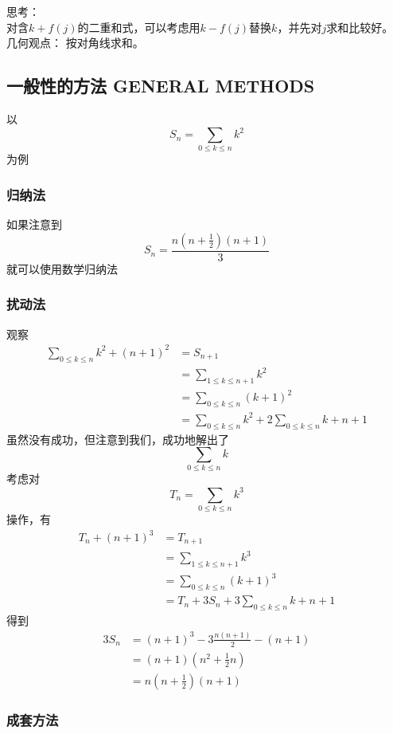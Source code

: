 思考：\\

对含$k+f(j)$的二重和式，可以考虑用$k-f(j)$替换$k$，并先对$j$求和比较好。\\

几何观点： 按对角线求和。

\subsection{一般性的方法 GENERAL METHODS }

以
$$
S_n=\sum_{0\le k \le n} k^2
$$
为例

\subsubsection{归纳法}
如果注意到
$$
S_n=\frac{n(n+\frac{1}{2})(n+1)}{3}
$$
就可以使用数学归纳法

\subsubsection{扰动法}

观察
$$
\begin{aligned}
\sum_{0\le k \le n} k^2+(n+1)^2&=S_{n+1}\\
&=\sum_{1 \le  k\le n+1} k^2\\
&=\sum_{0 \le k \le n}(k+1)^2\\
&=\sum_{0\le k \le n} k^2+2\sum_{0\le k \le n} k+n+1
\end{aligned}
$$
虽然没有成功，但注意到我们，成功地解出了
$$
\sum_{0 \le k \le n} k
$$
考虑对
$$
T_n=\sum_{0 \le k \le n} k^3
$$
操作，有
$$
\begin{aligned}
T_n+(n+1)^3&=T_{n+1}\\
&=\sum_{1 \le k \le n+1} k^3\\
&=\sum_{0 \le k \le n} (k+1)^3\\
&=T_n+3S_n+3\sum_{0 \le k \le n}k+n+1
\end{aligned}
$$
得到
$$
\begin{aligned}
3S_n&=(n+1)^3-3\frac{n(n+1)}{2}-(n+1)\\
&=(n+1)\left(n^2+\frac{1}{2}n\right)\\
&=n(n+\frac{1}{2})(n+1)
\end{aligned}
$$

\subsubsection{成套方法}

